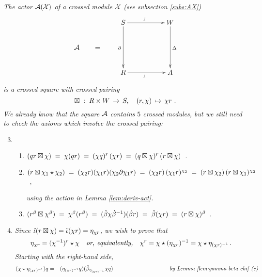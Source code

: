 \newpage
\begin{example} \label{ex:actor-square} 
\emph{The actor $\mathcal{A}(\mathcal{X})$ of a crossed module $\mathcal{X}$ 
(see subsection \ref{subs:AX})}
\begin{equation} \label{eq:actor}
\vcenter{\xymatrix{ 
               &  S \ar[rr]^(0.45){\ddi} \ar[dd]_{\partial}
                  &&  W \ar[dd]^{\Delta}  \\
\calA \qquad =  &     &&  \\
               &  R \ar[rr]_(0.45){\di}
                  &&  A
}} 
\end{equation}
\emph{is a crossed square with crossed pairing}
$$
\boxtimes \;:\;  R \times W \,\to\, S, \quad
(r,\chi) \,\mapsto\, \chi r~.
$$
\emph{We already know that the square  $\mathcal{A}$  contains $5$ crossed modules,
but we still need to check the axioms which involve the crossed pairing:}
\begin{enumerate}[{\rm (a)}]
\setcounter{enumi}{2}
\item
 \begin{enumerate}[{\rm (i)}]
 \item
  $(qr \boxtimes \chi) 
  \;=\; \chi(qr)
  \;=\; (\chi q)^r\,(\chi r)
  \;=\; (q \boxtimes \chi)^r\,(r \boxtimes \chi)$~.
 \item
  $(r \boxtimes \chi_1\star\chi_2)
  \;=\; (\chi_2 r)(\chi_1 r)(\chi_2\partial\chi_1 r)
  \;=\; (\chi_2 r)\,(\chi_1 r)^{\chi_2}
  \;=\; (r \boxtimes \chi_2)\,(r \boxtimes \chi_1)^{\chi_2}$~,
  \begin{flushright}
    \emph{using the action in Lemma \ref{lem:deriv-act}.}
  \end{flushright}
 \item
  $(r^{\beta} \boxtimes \chi^{\beta})
   \; = \; \chi^{\beta}(r^{\beta}) 
   \; = \; (\ddot{\beta} \chi \dot{\beta}^{-1})(\dot{\beta} r) 
   \; = \; \ddot{\beta}(\chi r) 
   \; = \; (r \boxtimes \chi)^{\beta}$~.
 \end{enumerate}
\item
\emph{Since $\ddot{\iota}(r \boxtimes \chi) = \ddot{\iota}(\chi r) = \eta_{\chi r}$,
we wish to prove that}
$$
\eta_{\chi r} = (\chi^{-1})^r \star \chi
\quad\mbox{\emph{or, equivalently,}}\quad
\chi^r = \chi \star (\eta_{\chi r})^{-1} = \chi \star \eta_{(\chi r)^{-1}}\,.
$$
\emph{Starting with the right-hand side,}
\begin{eqnarray*}
(\chi \star \eta_{(\chi r)^{-1}})q
 & = & (\eta_{(\chi r)^{-1}}q)(\ddb_{\eta_{(\chi r)^{-1}}} \chi q) 
        \hspace{34mm} \mbox{\emph{ by Lemma \ref{lem:gamma-beta-chi} (c)}} \\

\end{eqnarray*}
\end{enumerate}
\end{example}

